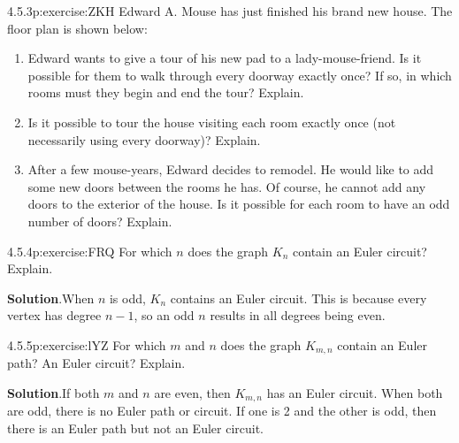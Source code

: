 \documentclass[twoside,11pt,]{book}
\newcommand{\blocktitlefont}{\relax}
\numberwithin{equation}{chapter}
\begin{document}
\begin{divisionsolution}{4.5.3}{}{p:exercise:ZKH}%
Edward A. Mouse has just finished his brand new house. The floor plan is shown below:%
\begin{sidebyside}{1}{0.26}{0.26}{0}%
\begin{sbspanel}{0.48}%
%
\end{sbspanel}%
\end{sidebyside}%
\par
%
\begin{enumerate}[label=(\alph*)]
\item{}Edward wants to give a tour of his new pad to a lady-mouse-friend. Is it possible for them to walk through every doorway exactly once? If so, in which rooms must they begin and end the tour? Explain. %
\item{}Is it possible to tour the house visiting each room exactly once (not necessarily using every doorway)? Explain. %
\item{}After a few mouse-years, Edward decides to remodel. He would like to add some new doors between the rooms he has. Of course, he cannot add any doors to the exterior of the house. Is it possible for each room to have an odd number of doors? Explain. %
\end{enumerate}
%
\end{divisionsolution}%
\begin{divisionsolution}{4.5.4}{}{p:exercise:FRQ}%
For which \(n\) does the graph \(K_n\) contain an Euler circuit? Explain.%
\par\smallskip%
\noindent\textbf{\blocktitlefont Solution}.\quad{}When \(n\) is odd, \(K_n\) contains an Euler circuit. This is because every vertex has degree \(n-1\), so an odd \(n\) results in all degrees being even.%
\end{divisionsolution}%
\begin{divisionsolution}{4.5.5}{}{p:exercise:lYZ}%
For which \(m\) and \(n\) does the graph \(K_{m,n}\) contain an Euler path? An Euler circuit? Explain.%
\par\smallskip%
\noindent\textbf{\blocktitlefont Solution}.\quad{}If both \(m\) and \(n\) are even, then \(K_{m,n}\) has an Euler circuit. When both are odd, there is no Euler path or circuit. If one is 2 and the other is odd, then there is an Euler path but not an Euler circuit.%
\end{divisionsolution}%
\end{document}
